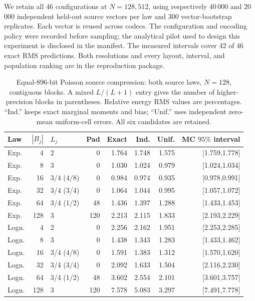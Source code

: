 We retain all 46 configurations at $N=128,512$, using respectively
40\,000 and 20\,000 independent held-out source vectors per law and
300 vector-bootstrap replicates. Each vector is reused across codecs.
The configuration and encoding policy were recorded before sampling; the
analytical pilot used to design this experiment is disclosed in the manifest.
The measured intervals cover 42 of 46 exact RMS predictions.
Both resolutions and every layout, interval, and population ranking are in
the reproduction package.

\begin{table}[tb]
\centering
\caption{Equal-$896$-bit Poisson source compression: both source laws,
$N=128$, contiguous blocks. A mixed $L/(L+1)$ entry gives the number of
higher-precision blocks in parentheses. Relative energy RMS values are
percentages. ``Ind.'' keeps exact marginal moments and bias; ``Unif.'' uses
independent zero-mean uniform-cell errors. All six candidates are retained.}
\label{tab:revision-poisson}
\begingroup\footnotesize\setlength{\tabcolsep}{2.2pt}
\begin{tabular}{lrlrrrrr}
\toprule
Law & $|B_j|$ & $L_j$ & Pad & Exact & Ind. & Unif. & MC $95\%$ interval\\
\midrule
Exp. & 4 & 2 & 0 & 1.764 & 1.748 & 1.575 & [1.759,1.778] \\
Exp. & 8 & 3 & 0 & 1.030 & 1.024 & 0.979 & [1.024,1.034] \\
Exp. & 16 & 3/4 (4/8) & 0 & 0.984 & 0.974 & 0.935 & [0.978,0.991] \\
Exp. & 32 & 3/4 (3/4) & 0 & 1.064 & 1.044 & 0.995 & [1.057,1.072] \\
Exp. & 64 & 3/4 (1/2) & 48 & 1.436 & 1.397 & 1.288 & [1.433,1.453] \\
Exp. & 128 & 3 & 120 & 2.213 & 2.115 & 1.833 & [2.193,2.229] \\
Logn. & 4 & 2 & 0 & 2.256 & 2.162 & 1.951 & [2.253,2.285] \\
Logn. & 8 & 3 & 0 & 1.438 & 1.343 & 1.283 & [1.433,1.462] \\
Logn. & 16 & 3/4 (4/8) & 0 & 1.591 & 1.383 & 1.312 & [1.570,1.620] \\
Logn. & 32 & 3/4 (3/4) & 0 & 2.092 & 1.633 & 1.504 & [2.116,2.230] \\
Logn. & 64 & 3/4 (1/2) & 48 & 3.602 & 2.554 & 2.101 & [3.601,3.757] \\
Logn. & 128 & 3 & 120 & 7.578 & 5.083 & 3.297 & [7.491,7.778] \\
\bottomrule
\end{tabular}\endgroup
\end{table}

